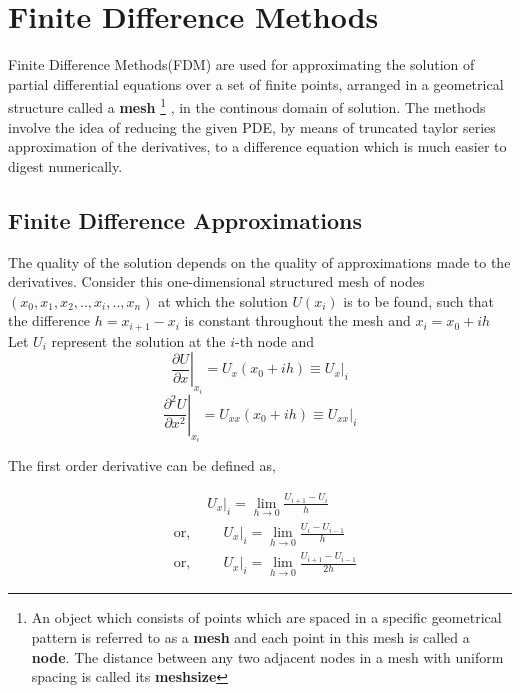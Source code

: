 \documentclass[11pt]{report}
\numberwithin{equation}{section}
\begin{document}
\section{\sffamily Finite Difference Methods}
Finite Difference Methods(FDM) are used for approximating the solution of partial differential equations over a set of finite points, arranged in a geometrical structure called a \textbf{mesh}%
\footnote[1]{An object which consists of points which are spaced in a specific geometrical pattern is referred to as a \textbf{mesh} and each point in this mesh is called a \textbf{node}. The distance between any two adjacent nodes in a mesh with uniform spacing is called its \textbf{meshsize}}%
, in the continous domain of solution. The methods involve the idea of reducing the given PDE, by means of truncated taylor series approximation of the derivatives, to a difference equation which is much easier to digest numerically. 
\subsection{Finite Difference Approximations}
The quality of the solution depends on the quality of approximations made to the derivatives.
Consider this one-dimensional structured mesh of nodes $(x_0,x_1,x_2,..,x_i,..,x_n)$ at which the solution $U(x_i)$  is to be found, such that the difference $h = x_{i+1} - x_i $ is constant throughout the mesh and $x_i = x_0 + ih$\\
Let $U_i$ represent the solution at the $i$-th node and 
\begin{equation*}
    \left. \frac{\partial U}{\partial x} \right|_{x_ i} = U_{x}(x_0 + ih) \equiv U_{x}|_i
\end{equation*} 
\begin{equation*}
    \left. \frac{\partial^2 U}{\partial x^2} \right|_{x_ i} = U_{xx}(x_0 + ih) \equiv U_{xx}|_i
\end{equation*}

The first order derivative can be defined as,
{\raggedright 
\begin{align*}
    &\text{} \hspace{1cm} U_x|_i = \lim_{h \to 0} \frac{U_{i+1} - U_i}{h}  \\
    &\text{or,} \hspace{1cm} U_x|_i = \lim_{h \to 0} \frac{U_{i} - U_{i-1}}{h}  \\
    &\text{or,} \hspace{1cm} U_x|_i = \lim_{h \to 0} \frac{U_{i+1} - U_{i-1}}{2h}  
\end{align*}
}
\end{document}
